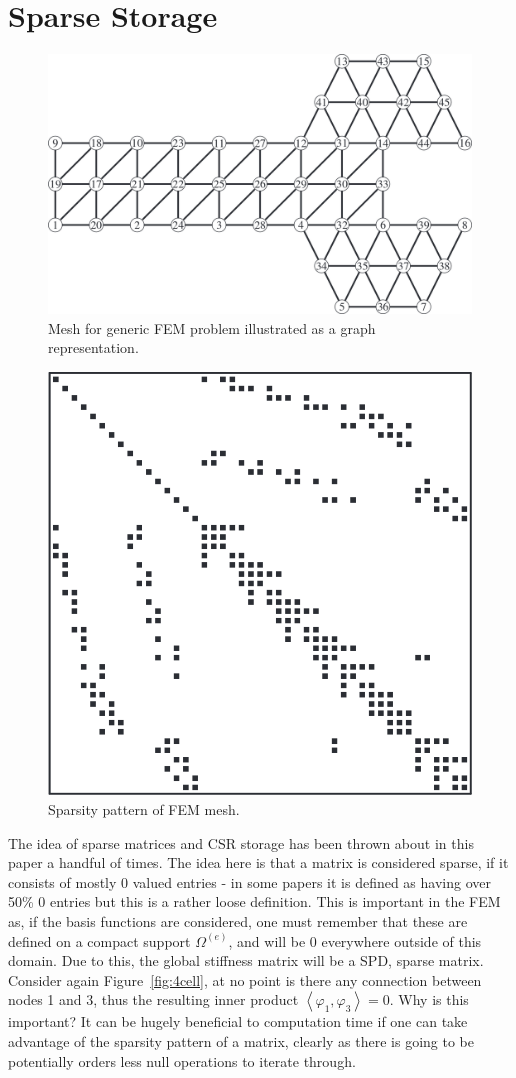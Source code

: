 \section{Sparse Storage}\label{sparse}

\begin{figure}
	\centering
	\includegraphics[width=0.7\linewidth]{Figures/mesh_graph}
	\caption{Mesh for generic FEM problem illustrated as a graph representation.~\cite{saad}}
	\label{fig:graph}
\end{figure}
\begin{figure}
	\centering
	\includegraphics[width=0.4\linewidth]{Figures/sparsity_pattern}
	\caption{Sparsity pattern of FEM mesh.~\cite{saad}}
	\label{fig:pattern}
\end{figure}

The idea of sparse matrices and CSR storage has been thrown about in this paper a handful of times. The idea here is that a matrix is considered sparse, if it consists of mostly 0 valued entries - in some papers it is defined as having over 50\% 0 entries but this is a rather loose definition. This is important in the FEM as, if the basis functions are considered, one must remember that these are defined on a compact support $\Omega^{(e)}$, and will be 0 everywhere outside of this domain. Due to this, the global stiffness matrix will be a SPD, sparse matrix. Consider again Figure~\ref{fig:4cell}, at no point is there any connection between nodes 1 and 3, thus the resulting inner product $\left\langle\varphi_1,\varphi_3\right\rangle=0$. Why is this important? It can be hugely beneficial to computation time if one can take advantage of the sparsity pattern of a matrix, clearly as there is going to be potentially orders less null operations to iterate through.

